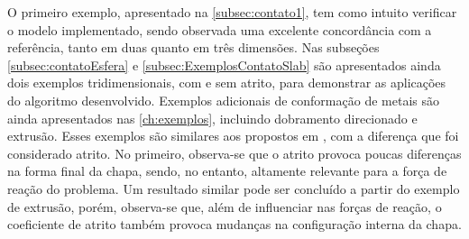 \documentclass[Relatorio-FAPESP-2020.tex]{subfiles}
\begin{document}
O primeiro exemplo, apresentado na \autoref{subsec:contato1}, tem como intuito verificar o modelo implementado, sendo observada uma excelente concordância com a referência, tanto em duas quanto em três dimensões. Nas subseções \ref{subsec:contatoEsfera} e \ref{subsec:ExemplosContatoSlab} são apresentados ainda dois exemplos tridimensionais, com e sem atrito, para demonstrar as aplicações do algoritmo desenvolvido. Exemplos adicionais de conformação de metais são ainda apresentados nas \autoref{ch:exemplos}, incluindo dobramento direcionado e extrusão. Esses exemplos são similares aos propostos em , com a diferença que foi considerado atrito. No primeiro, observa-se que o atrito provoca poucas diferenças na forma final da chapa, sendo, no entanto, altamente relevante para a força de reação do problema. Um resultado similar pode ser concluído a partir do exemplo de extrusão, porém, observa-se que, além de influenciar nas forças de reação, o coeficiente de atrito também provoca mudanças na configuração interna da chapa.
\end{document}
